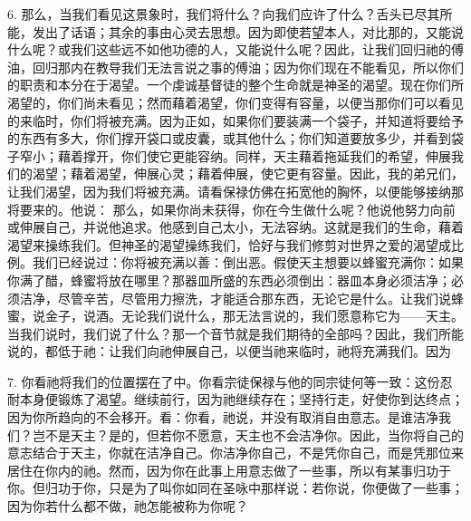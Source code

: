 6. 那么，当我们看见这景象时，我们将什么？向我们应许了什么？舌头已尽其所能，发出了话语；其余的事由心灵去思想。因为即使若望本人，对比那的，又能说什么呢？或我们这些远不如他功德的人，又能说什么呢？因此，让我们回归祂的傅油，回归那内在教导我们无法言说之事的傅油；因为你们现在不能看见，所以你们的职责和本分在于渴望。一个虔诚基督徒的整个生命就是神圣的渴望。现在你们所渴望的，你们尚未看见；然而藉着渴望，你们变得有容量，以便当那你们可以看见的来临时，你们将被充满。因为正如，如果你们要装满一个袋子，并知道将要给予的东西有多大，你们撑开袋口或皮囊，或其他什么；你们知道要放多少，并看到袋子窄小；藉着撑开，你们使它更能容纳。同样，天主藉着拖延我们的希望，伸展我们的渴望；藉着渴望，伸展心灵；藉着伸展，使它更有容量。因此，我的弟兄们，让我们渴望，因为我们将被充满。请看保禄仿佛在拓宽他的胸怀，以便能够接纳那将要来的。他说： 那么，如果你尚未获得，你在今生做什么呢？他说他努力向前或伸展自己，并说他追求。他感到自己太小，无法容纳。这就是我们的生命，藉着渴望来操练我们。但神圣的渴望操练我们，恰好与我们修剪对世界之爱的渴望成比例。我们已经说过：你将被充满以善：倒出恶。假使天主想要以蜂蜜充满你：如果你满了醋，蜂蜜将放在哪里？那器皿所盛的东西必须倒出：器皿本身必须洁净；必须洁净，尽管辛苦，尽管用力擦洗，才能适合那东西，无论它是什么。让我们说蜂蜜，说金子，说酒。无论我们说什么，那无法言说的，我们愿意称它为——天主。当我们说时，我们说了什么？那一个音节就是我们期待的全部吗？因此，我们所能说的，都低于祂：让我们向祂伸展自己，以便当祂来临时，祂将充满我们。因为\par

7. 你看祂将我们的位置摆在了中。你看宗徒保禄与他的同宗徒何等一致：这份忍耐本身便锻炼了渴望。继续前行，因为祂继续存在；坚持行走，好使你到达终点；因为你所趋向的不会移开。看：你看，祂说，并没有取消自由意志。是谁洁净我们？岂不是天主？是的，但若你不愿意，天主也不会洁净你。因此，当你将自己的意志结合于天主，你就在洁净自己。你洁净你自己，不是凭你自己，而是凭那位来居住在你内的祂。然而，因为你在此事上用意志做了一些事，所以有某事归功于你。但归功于你，只是为了叫你如同在圣咏中那样说：若你说，你便做了一些事；因为你若什么都不做，祂怎能被称为你呢？\par

